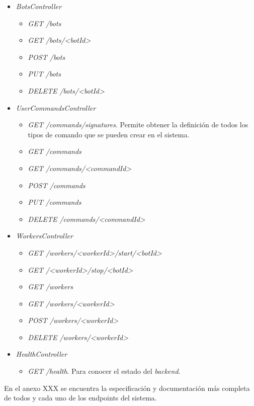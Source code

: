 \begin{itemize}
	\item \textit{BotsController}
	\begin{itemize}
		\item \textit{GET /bots}
		\item \textit{GET /bots/<botId>}
		\item \textit{POST /bots}
		\item \textit{PUT /bots}
		\item \textit{DELETE /bots/<botId>}
	\end{itemize}
	\item \textit{UserCommandsController}
	\begin{itemize}
		\item \textit{GET /commands/signatures}. Permite obtener la definición de todos los tipos de comando que se pueden crear en el sistema.
		\item \textit{GET /commands}
		\item \textit{GET /commands/<commandId>}
		\item \textit{POST /commands}
		\item \textit{PUT /commands}
		\item \textit{DELETE /commands/<commandId>}
	\end{itemize}
	\item \textit{WorkersController}
	\begin{itemize}
		\item \textit{GET /workers/<workerId>/start/<botId>}
		\item \textit{GET /<workerId>/stop/<botId>}
		\item \textit{GET /workers}
		\item \textit{GET /workers/<workerId>}
		\item \textit{POST /workers/<workerId>}
		\item \textit{DELETE /workers/<workerId>}
	\end{itemize}
	\item \textit{HealthController}
	\begin{itemize}
		\item \textit{GET /health}. Para conocer el estado del \textit{backend}.
	\end{itemize}
\end{itemize}

En el anexo XXX se encuentra la especificación y documentación más completa de todos y cada uno de los endpoints del sistema.






